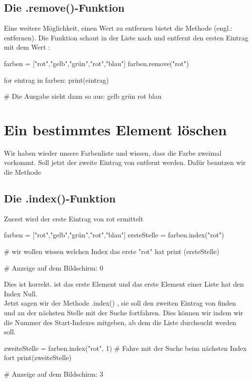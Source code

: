 \documentclass{\VorlagenPfad/coderdojokatext}
\begin{document}
\subsection{Die .remove()-Funktion}
Eine weitere Möglichkeit, einen Wert zu entfernen bietet die Methode  (engl.: entfernen). Die Funktion schaut in der Liste nach und entfernt den ersten Eintrag mit dem Wert :

\begin{pythoncode}
farben = ["rot","gelb","grün","rot","blau"]  
farben.remove("rot")

for eintrag in farben:
	print(eintrag)

# Die Ausgabe sieht dann so aus:  gelb grün rot blau  
\end{pythoncode}


\section{Ein bestimmtes Element löschen}
Wir haben wieder unsere Farbenliste und wissen, dass die Farbe  zweimal vorkommt.
Soll jetzt der zweite Eintrag von  entfernt werden. Dafür benutzen wir die Methode

\subsection{Die .index()-Funktion}
Zuerst wird der erste Eintrag von rot ermittelt
\begin{pythoncode}
farben = ["rot","gelb","grün","rot","blau"]
ersteStelle = farben.index("rot")

# wir wollen wissen welchen Index das erste "rot" hat
print (ersteStelle) 	

# Anzeige auf dem Bildschirm:  0
\end{pythoncode}


Dies ist korrekt.  ist das erste Element und das erste Element einer Liste hat den Index Null.
\\

Jetzt sagen wir der Methode .index() , sie soll den zweiten Eintrag von   finden und an der nächsten Stelle mit der Suche fortfahren. Dies können wir indem wir die Nummer des Start-Indexes mitgeben, ab dem die Liste durchsucht werden soll.

\begin{pythoncode}
zweiteStelle = farben.index("rot", 1)	# Fahre mit der Suche beim nächsten Index fort 
print(zweiteStelle)

# Anzeige auf dem Bildschirm: 3   
\end{pythoncode}
\end{document}
